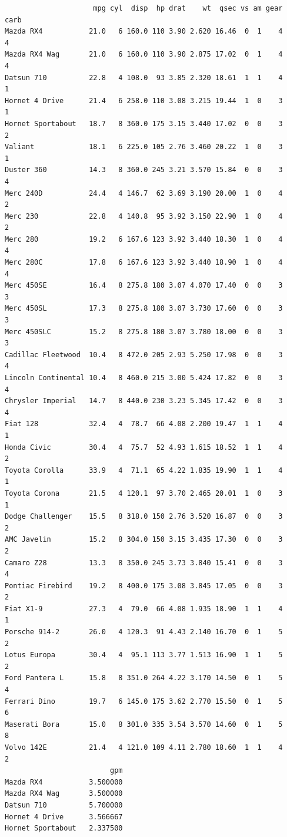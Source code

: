 \documentclass[
  letterpaper,
  DIV=11,
  numbers=noendperiod]{scrreprt}
\begin{document}
\begin{verbatim}
                     mpg cyl  disp  hp drat    wt  qsec vs am gear carb
Mazda RX4           21.0   6 160.0 110 3.90 2.620 16.46  0  1    4    4
Mazda RX4 Wag       21.0   6 160.0 110 3.90 2.875 17.02  0  1    4    4
Datsun 710          22.8   4 108.0  93 3.85 2.320 18.61  1  1    4    1
Hornet 4 Drive      21.4   6 258.0 110 3.08 3.215 19.44  1  0    3    1
Hornet Sportabout   18.7   8 360.0 175 3.15 3.440 17.02  0  0    3    2
Valiant             18.1   6 225.0 105 2.76 3.460 20.22  1  0    3    1
Duster 360          14.3   8 360.0 245 3.21 3.570 15.84  0  0    3    4
Merc 240D           24.4   4 146.7  62 3.69 3.190 20.00  1  0    4    2
Merc 230            22.8   4 140.8  95 3.92 3.150 22.90  1  0    4    2
Merc 280            19.2   6 167.6 123 3.92 3.440 18.30  1  0    4    4
Merc 280C           17.8   6 167.6 123 3.92 3.440 18.90  1  0    4    4
Merc 450SE          16.4   8 275.8 180 3.07 4.070 17.40  0  0    3    3
Merc 450SL          17.3   8 275.8 180 3.07 3.730 17.60  0  0    3    3
Merc 450SLC         15.2   8 275.8 180 3.07 3.780 18.00  0  0    3    3
Cadillac Fleetwood  10.4   8 472.0 205 2.93 5.250 17.98  0  0    3    4
Lincoln Continental 10.4   8 460.0 215 3.00 5.424 17.82  0  0    3    4
Chrysler Imperial   14.7   8 440.0 230 3.23 5.345 17.42  0  0    3    4
Fiat 128            32.4   4  78.7  66 4.08 2.200 19.47  1  1    4    1
Honda Civic         30.4   4  75.7  52 4.93 1.615 18.52  1  1    4    2
Toyota Corolla      33.9   4  71.1  65 4.22 1.835 19.90  1  1    4    1
Toyota Corona       21.5   4 120.1  97 3.70 2.465 20.01  1  0    3    1
Dodge Challenger    15.5   8 318.0 150 2.76 3.520 16.87  0  0    3    2
AMC Javelin         15.2   8 304.0 150 3.15 3.435 17.30  0  0    3    2
Camaro Z28          13.3   8 350.0 245 3.73 3.840 15.41  0  0    3    4
Pontiac Firebird    19.2   8 400.0 175 3.08 3.845 17.05  0  0    3    2
Fiat X1-9           27.3   4  79.0  66 4.08 1.935 18.90  1  1    4    1
Porsche 914-2       26.0   4 120.3  91 4.43 2.140 16.70  0  1    5    2
Lotus Europa        30.4   4  95.1 113 3.77 1.513 16.90  1  1    5    2
Ford Pantera L      15.8   8 351.0 264 4.22 3.170 14.50  0  1    5    4
Ferrari Dino        19.7   6 145.0 175 3.62 2.770 15.50  0  1    5    6
Maserati Bora       15.0   8 301.0 335 3.54 3.570 14.60  0  1    5    8
Volvo 142E          21.4   4 121.0 109 4.11 2.780 18.60  1  1    4    2
                         gpm
Mazda RX4           3.500000
Mazda RX4 Wag       3.500000
Datsun 710          5.700000
Hornet 4 Drive      3.566667
Hornet Sportabout   2.337500

\end{verbatim}
\end{document}
